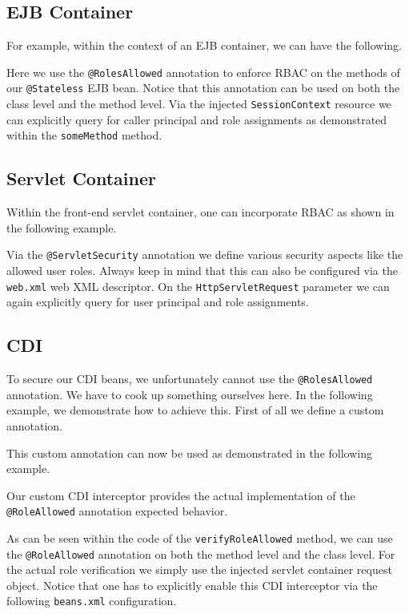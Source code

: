 \subsection{EJB Container}
For example, within the context of an EJB container, we can have the following.

Here we use the \texttt{@RolesAllowed} annotation to enforce RBAC on the methods of our \texttt{@Stateless} EJB bean.
Notice that this annotation can be used on both the class level and the method level.
Via the injected \texttt{SessionContext} resource we can explicitly query for caller principal and role assignments as demonstrated within the \texttt{someMethod} method.

\subsection{Servlet Container}
Within the front-end servlet container, one can incorporate RBAC as shown in the following example.

Via the \texttt{@ServletSecurity} annotation we define various security aspects like the allowed user roles.
Always keep in mind that this can also be configured via the \texttt{web.xml} web XML descriptor.
On the \texttt{HttpServletRequest} parameter we can again explicitly query for user principal and role assignments.

\subsection{CDI}
To secure our CDI beans, we unfortunately cannot use the \texttt{@RolesAllowed} annotation.
We have to cook up something ourselves here.
In the following example, we demonstrate how to achieve this.
First of all we define a custom annotation.

This custom annotation can now be used as demonstrated in the following example.

Our custom CDI interceptor provides the actual implementation of the \texttt{@RoleAllowed} annotation expected behavior.

As can be seen within the code of the \texttt{verifyRoleAllowed} method,
we can use the \texttt{@RoleAllowed} annotation on both the method level and the class level.
For the actual role verification we simply use the injected servlet container request object.
Notice that one has to explicitly enable this CDI interceptor via the following \texttt{beans.xml} configuration.


